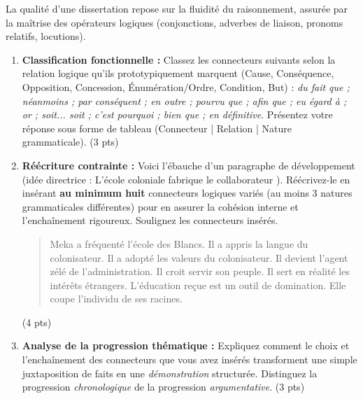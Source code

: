 \documentclass[11pt]{article}
\begin{document}
\begin{exercice}
La qualité d'une dissertation repose sur la fluidité du raisonnement, assurée par la maîtrise des opérateurs logiques (conjonctions, adverbes de liaison, pronoms relatifs, locutions).

\begin{enumerate}
    \item \textbf{Classification fonctionnelle :} Classez les connecteurs suivants selon la relation logique qu'ils prototypiquement marquent (Cause, Conséquence, Opposition, Concession, Énumération/Ordre, Condition, But) : \textit{du fait que ; néanmoins ; par conséquent ; en outre ; pourvu que ; afin que ; eu égard à ; or ; soit... soit ; c'est pourquoi ; bien que ; en définitive}. Présentez votre réponse sous forme de tableau (Connecteur | Relation | Nature grammaticale). (3 pts)
    \item \textbf{Réécriture contrainte :} Voici l'ébauche d'un paragraphe de développement (idée directrice : \og L'école coloniale fabrique le collaborateur \fg). Réécrivez-le en insérant \textbf{au minimum huit} connecteurs logiques variés (au moins 3 natures grammaticales différentes) pour en assurer la cohésion interne et l'enchaînement rigoureux. Soulignez les connecteurs insérés.
    \begin{quote}
    Meka a fréquenté l'école des Blancs. Il a appris la langue du colonisateur. Il a adopté les valeurs du colonisateur. Il devient l'agent zélé de l'administration. Il croit servir son peuple. Il sert en réalité les intérêts étrangers. L'éducation reçue est un outil de domination. Elle coupe l'individu de ses racines.
    \end{quote}
    (4 pts)
    \item \textbf{Analyse de la progression thématique :} Expliquez comment le choix et l'enchaînement des connecteurs que vous avez insérés transforment une simple juxtaposition de faits en une \textit{démonstration} structurée. Distinguez la progression \textit{chronologique} de la progression \textit{argumentative}. (3 pts)
\end{enumerate}
\end{exercice}
\end{document}

